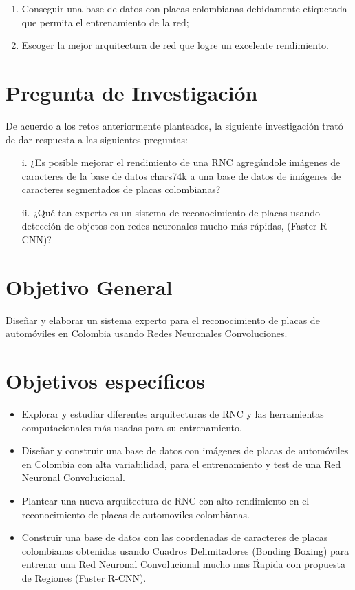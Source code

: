 \begin{enumerate}
\item Conseguir una base de datos con placas colombianas debidamente etiquetada que permita el entrenamiento de la red; 
\item Escoger la mejor arquitectura de red que logre un excelente rendimiento.  
\end{enumerate}
\section{Pregunta de Investigación}

De acuerdo a los retos anteriormente planteados, la siguiente investigación trató de dar respuesta a las siguientes preguntas:

\begin{itemize}
    \item[i.] ¿Es posible mejorar el rendimiento de una RNC agregándole imágenes de caracteres de la base de datos chars74k a una base de datos de imágenes de caracteres segmentados de placas colombianas?
    \item[ii.]¿Qué tan experto es un sistema de reconocimiento de placas usando detección de objetos con redes neuronales mucho más rápidas, (Faster R-CNN)?
   
\end{itemize}

\section{Objetivo General}
Diseñar y elaborar un sistema experto para el reconocimiento de placas de automóviles en Colombia usando Redes Neuronales Convoluciones.
\section{Objetivos específicos}
\begin{itemize}
    \item Explorar y estudiar diferentes arquitecturas de RNC y las herramientas computacionales más usadas para su entrenamiento.

    \item Diseñar y construir una base de datos con imágenes de placas de automóviles en Colombia con alta variabilidad, para el entrenamiento y test de una  Red Neuronal Convolucional.

    \item Plantear una nueva arquitectura de RNC con alto rendimiento en el reconocimiento de placas de automoviles colombianas.
    
    \item Construir una base de datos con las coordenadas de caracteres de placas colombianas obtenidas usando Cuadros Delimitadores  (Bonding  Boxing) para entrenar una  Red  Neuronal  Convolucional mucho mas Ŕapida con propuesta de Regiones (Faster R-CNN). 
    
\end{itemize}

